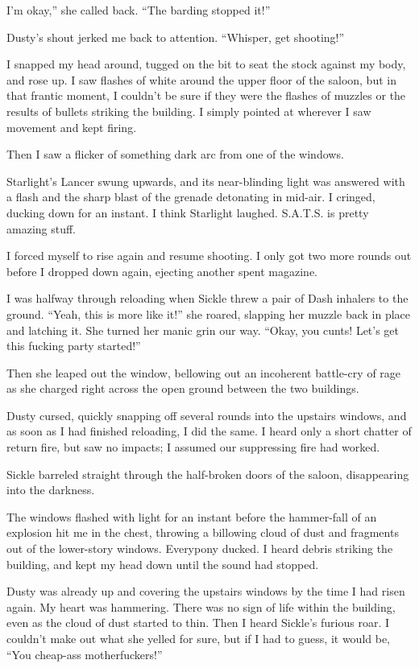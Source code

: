 \leavevmode{}I’m okay,” she called back. “The barding stopped it!”

Dusty’s shout jerked me back to attention. “Whisper, get shooting!”

I snapped my head around, tugged on the bit to seat the stock against my body, and rose up. I saw flashes of white around the upper floor of the saloon, but in that frantic moment, I couldn’t be sure if they were the flashes of muzzles or the results of bullets striking the building. I simply pointed at wherever I saw movement and kept firing.

Then I saw a flicker of something dark arc from one of the windows.

Starlight’s Lancer swung upwards, and its near-blinding light was answered with a flash and the sharp blast of the grenade detonating in mid-air. I cringed, ducking down for an instant. I think Starlight laughed. S.A.T.S. is pretty amazing stuff.

I forced myself to rise again and resume shooting. I only got two more rounds out before I dropped down again, ejecting another spent magazine.

I was halfway through reloading when Sickle threw a pair of Dash inhalers to the ground. “Yeah, this is more like it!” she roared, slapping her muzzle back in place and latching it. She turned her manic grin our way. “Okay, you cunts! Let’s get this fucking party started!”

Then she leaped out the window, bellowing out an incoherent battle-cry of rage as she charged right across the open ground between the two buildings.

Dusty cursed, quickly snapping off several rounds into the upstairs windows, and as soon as I had finished reloading, I did the same. I heard only a short chatter of return fire, but saw no impacts; I assumed our suppressing fire had worked.

Sickle barreled straight through the half-broken doors of the saloon, disappearing into the darkness.

The windows flashed with light for an instant before the hammer-fall of an explosion hit me in the chest, throwing a billowing cloud of dust and fragments out of the lower-story windows. Everypony ducked. I heard debris striking the building, and kept my head down until the sound had stopped.

Dusty was already up and covering the upstairs windows by the time I had risen again. My heart was hammering. There was no sign of life within the building, even as the cloud of dust started to thin. Then I heard Sickle’s furious roar. I couldn’t make out what she yelled for sure, but if I had to guess, it would be, “You cheap-ass motherfuckers!”


